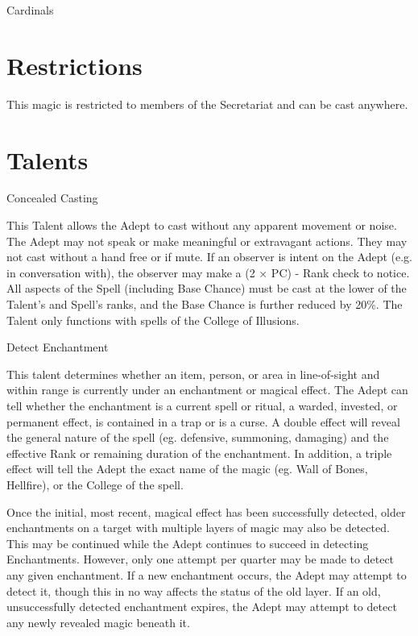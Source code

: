 \documentclass{report}
\begin{document}
\begin{College}{Cardinals}

\section{Restrictions}

This magic is restricted to members of the Secretariat and can
be cast anywhere.

\section{Talents}

\begin{talent}[T-1]{Concealed Casting}
\begin{effects}
This Talent allows the Adept to cast without any apparent movement or
noise.  The Adept may not speak or make meaningful or extravagant
actions. They may not cast without a hand free or if mute.  If an
observer is intent on the Adept (e.g. in conversation with), the
observer may make a (2 × PC) - Rank check to notice. All aspects of
the Spell (including Base Chance) must be cast at the lower of the
Talent’s and Spell’s ranks, and the Base Chance is further reduced by
20\%. The Talent only functions with spells of the College of
Illusions.
\end{effects}
\end{talent}

\begin{talent}[T-2]{Detect Enchantment}

\begin{effects}
This talent determines whether an item, person, or area in
line-of-sight and within range is currently under an enchantment or
magical effect.  The Adept can tell whether the enchantment is a
current spell or ritual, a warded, invested, or permanent effect, is
contained in a trap or is a curse.  A double effect will reveal the
general nature of the spell (eg. defensive, summoning, damaging) and
the effective Rank or remaining duration of the enchantment.  In
addition, a triple effect will tell the Adept the exact name of the
magic (eg. Wall of Bones, Hellfire), or the College of the spell.

Once the initial, most recent, magical effect has been successfully
detected, older enchantments on a target with multiple layers of magic
may also be detected.  This may be continued while the Adept continues
to succeed in detecting Enchantments.  However, only one attempt per
quarter may be made to detect any given enchantment.  If a new
enchantment occurs, the Adept may attempt to detect it, though this in
no way affects the status of the old layer.  If an old, unsuccessfully
detected enchantment expires, the Adept may attempt to detect any
newly revealed magic beneath it.


\end{effects}
\end{talent}
\end{College}
\end{document}

